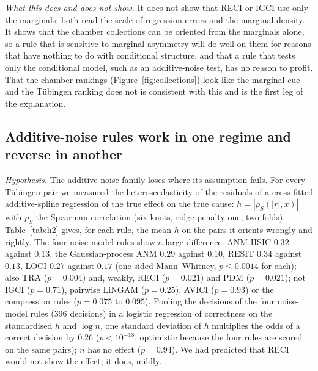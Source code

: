 \emph{What this does and does not show.} It does not show that RECI or IGCI use only the marginals: both read the scale of regression errors and the marginal density. It shows that the chamber collections can be oriented from the marginals alone, so a rule that is sensitive to marginal asymmetry will do well on them for reasons that have nothing to do with conditional structure, and that a rule that tests only the conditional model, such as an additive-noise test, has no reason to profit. That the chamber rankings (Figure~\ref{fig:collections}) look like the marginal cue and the T\"ubingen ranking does not is consistent with this and is the first leg of the explanation.

\subsection{Additive-noise rules work in one regime and reverse in another}\label{sec:regimes}
\emph{Hypothesis.} The additive-noise family loses where its assumption fails. For every T\"ubingen pair we measured the heteroscedasticity of the residuals of a cross-fitted additive-spline regression of the true effect on the true cause: $h=|\rho_S(|r|,x)|$ with $\rho_S$ the Spearman correlation (six knots, ridge penalty one, two folds). Table~\ref{tab:h2} gives, for each rule, the mean $h$ on the pairs it orients wrongly and rightly. The four noise-model rules show a large difference: ANM-HSIC $0.32$ against $0.13$, the Gaussian-process ANM $0.29$ against $0.10$, RESIT $0.34$ against $0.13$, LOCI $0.27$ against $0.17$ (one-sided Mann--Whitney, $p\le 0.0014$ for each); also TRA ($p=0.004$) and, weakly, RECI ($p=0.021$) and PDM ($p=0.021$); not IGCI ($p=0.71$), pairwise LiNGAM ($p=0.25$), AVICI ($p=0.93$) or the compression rules ($p=0.075$ to $0.095$). Pooling the decisions of the four noise-model rules ($396$ decisions) in a logistic regression of correctness on the standardised $h$ and $\log n$, one standard deviation of $h$ multiplies the odds of a correct decision by $0.26$ ($p<10^{-18}$, optimistic because the four rules are scored on the same pairs); $n$ has no effect ($p=0.94$). We had predicted that RECI would not show the effect; it does, mildly.

